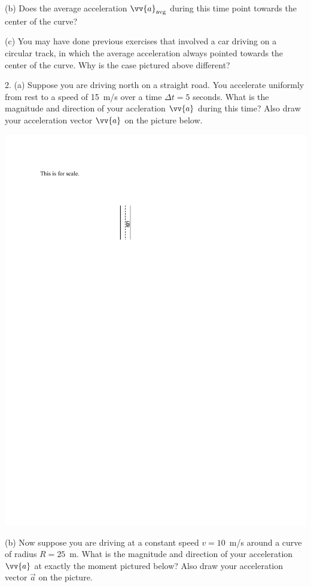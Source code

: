 (b) Does the average acceleration $\vv{a}_{\rm avg}$ during this time point towards the center of the curve?
\answerspace{0.3in}


(c) You may have done previous exercises
that involved a car driving on a circular track, in which the average acceleration always pointed towards the center of the curve.  
Why is the case pictured above different?
\answerspace{0.3in}

2.  (a) Suppose you are driving north on a straight road.  You accelerate uniformly from rest to a speed of 15~m/s over a time $\Delta t = 5$ seconds.  What is the magnitude and direction of your accleration $\vv{a}$ during this time?  Also draw your acceleration vector $\vv{a}$ on the picture below.

\hspace{1.0in}\includegraphics{tangential_and_centripetal_acc/straight.pdf}

(b) Now suppose you are driving at a constant speed $v=10$~m/s around a curve of radius $R=25$~m.  What is the magnitude and direction of your acceleration $\vv{a}$ at exactly the moment pictured below?  Also draw your acceleration vector $\vec{a}$ on the picture.

